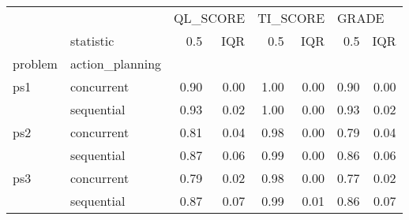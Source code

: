 \begin{tabular}{llrrrrrr}
\toprule
    & {} & \multicolumn{2}{l}{QL\_SCORE} & \multicolumn{2}{l}{TI\_SCORE} & \multicolumn{2}{l}{GRADE} \\
    & statistic &      0.5 &  IQR &      0.5 &  IQR &   0.5 &  IQR \\
problem & action\_planning &          &      &          &      &       &      \\
\midrule
ps1 & concurrent &     0.90 & 0.00 &     1.00 & 0.00 &  0.90 & 0.00 \\
    & sequential &     0.93 & 0.02 &     1.00 & 0.00 &  0.93 & 0.02 \\
ps2 & concurrent &     0.81 & 0.04 &     0.98 & 0.00 &  0.79 & 0.04 \\
    & sequential &     0.87 & 0.06 &     0.99 & 0.00 &  0.86 & 0.06 \\
ps3 & concurrent &     0.79 & 0.02 &     0.98 & 0.00 &  0.77 & 0.02 \\
    & sequential &     0.87 & 0.07 &     0.99 & 0.01 &  0.86 & 0.07 \\
\bottomrule
\end{tabular}
